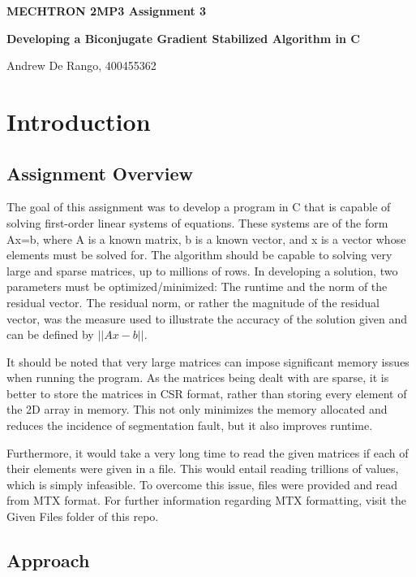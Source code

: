 \documentclass[12pt]{article}
\begin{document}
	
	\justifying
	
	\begin{center}
		\textbf{{\large MECHTRON 2MP3 Assignment 3}}
		
		\textbf{Developing a Biconjugate Gradient Stabilized Algorithm in C}
		
		Andrew De Rango, 400455362
	\end{center}
	
		
	
	
	\section{Introduction}

\subsection{Assignment Overview}

    The goal of this assignment was to develop a program in C that is capable of solving first-order linear systems of equations. These systems are of the form Ax=b, where A is a known matrix, b is a known vector, and x is a vector whose elements must be solved for. The algorithm should be capable to solving very large and sparse matrices, up to millions of rows. In developing a solution, two parameters must be optimized/minimized: The runtime and the norm of the residual vector. The residual norm, or rather the magnitude of the residual vector, was the measure used to illustrate the accuracy of the solution given and can be defined by \( ||Ax - b|| \).

    It should be noted that very large matrices can impose significant memory issues when running the program. As the matrices being dealt with are sparse, it is better to store the matrices in CSR format, rather than storing every element of the 2D array in memory. This not only minimizes the memory allocated and reduces the incidence of segmentation fault, but it also improves runtime.

    Furthermore, it would take a very long time to read the given matrices if each of their elements were given in a file. This would entail reading trillions of values, which is simply infeasible. To overcome this issue, files were provided and read from MTX format. For further information regarding MTX formatting, visit the Given Files folder of this repo.

\subsection{Approach}
\end{document}
